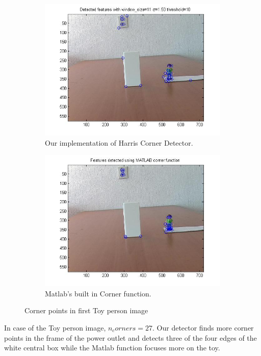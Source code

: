 \documentclass[11pt]{article}
\begin{document}
\begin{figure}[H] \centering
	\begin{subfigure}{.5\textwidth} \centering
		\includegraphics[width=.9\textwidth]{imgs/ourCorners_person.jpg}
		\caption{Our implementation of Harris Corner Detector.}
		\label{fig:ourCorners_person}
	\end{subfigure}%
	\begin{subfigure}{.5\textwidth}	\centering
		\includegraphics[width=.9\textwidth]{imgs/matlabCorners_person.jpg}
		\caption{Matlab's built in Corner function.}
		\label{fig:matlabCorners_person}
	\end{subfigure}
	\caption{Corner points in first Toy person image}
	\label{fig:corners_person}
\end{figure}

In case of the Toy person image, $n_corners = 27$. Our detector finds more corner points in the frame of the power outlet and detects three of the four edges of the white central box while the Matlab function focuses more on the toy.
\end{document}
